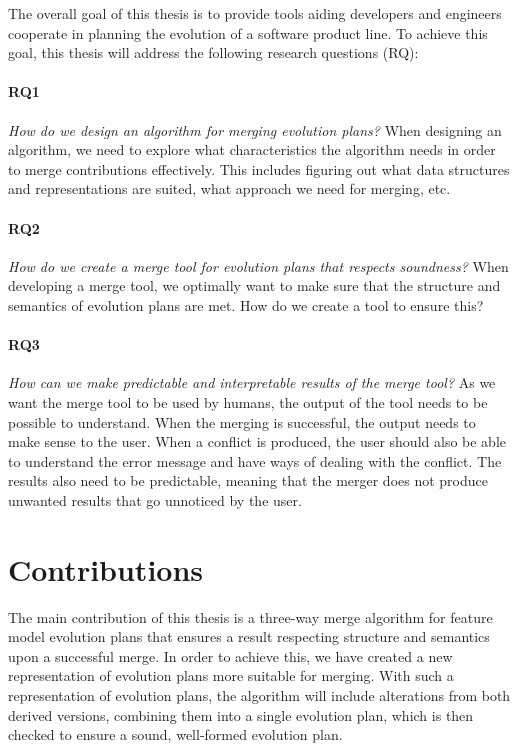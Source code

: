 \documentclass[a4paper,english]{ifimaster}
\begin{document}
The overall goal of this thesis is to provide tools aiding developers and engineers cooperate in planning the evolution of a software product line. To achieve this goal, this thesis will address the following research questions (RQ):

\paragraph{RQ1}

\textit{How do we design an algorithm for merging evolution plans?} When designing an algorithm, we need to explore what characteristics the algorithm needs in order to merge contributions effectively. This includes figuring out what data structures and representations are suited, what approach we need for merging, etc.

\paragraph{RQ2}

\textit{How do we create a merge tool for evolution plans that respects soundness?} When developing a merge tool, we optimally want to make sure that the structure and semantics of evolution plans are met. How do we create a tool to ensure this?

\paragraph{RQ3}

\textit{How can we make predictable and interpretable results of the merge tool?} As we want the merge tool to be used by humans, the output of the tool needs to be possible to understand. When the merging is successful, the output needs to make sense to the user. When a conflict is produced, the user should also be able to understand the error message and have ways of dealing with the conflict. The results also need to be predictable, meaning that the merger does not produce unwanted results that go unnoticed by the user.

\section{Contributions}%
\label{sec:contributions}

The main contribution of this thesis is a three-way merge algorithm for feature model evolution plans that ensures a result respecting structure and semantics upon a successful merge. In order to achieve this, we have created a new representation of evolution plans more suitable for merging. With such a representation of evolution plans, the algorithm will include alterations from both derived versions, combining them into a single evolution plan, which is then checked to ensure a sound, well-formed evolution plan.
\end{document}
